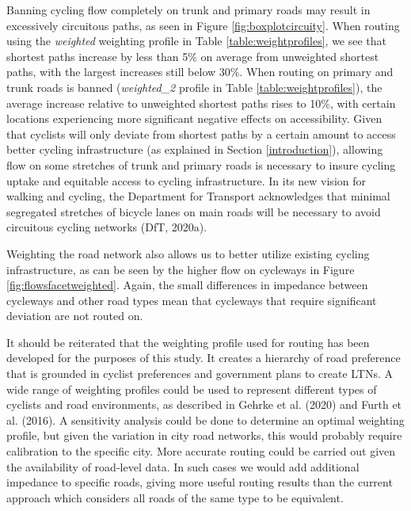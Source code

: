 \documentclass[
]{article}
\begin{document}
Banning cycling flow completely on trunk and primary roads may result in
excessively circuitous paths, as seen in Figure
\ref{fig:boxplotcircuity}. When routing using the \emph{weighted} weighting
profile in Table \ref{table:weightprofiles}, we see that shortest paths
increase by less than 5\% on average from unweighted shortest paths, with
the largest increases still below 30\%. When routing on primary and trunk
roads is banned (\emph{weighted\_2} profile in Table
\ref{table:weightprofiles}), the average increase relative to
unweighted shortest paths rises to 10\%, with certain locations
experiencing more significant negative effects on accessibility. Given
that cyclists will only deviate from shortest paths by a certain amount
to access better cycling infrastructure (as explained in Section
\ref{introduction}), allowing flow on some stretches of trunk and
primary roads is necessary to insure cycling uptake and equitable access
to cycling infrastructure. In its new vision for walking and cycling,
the Department for Transport acknowledges that minimal segregated
stretches of bicycle lanes on main roads will be necessary to avoid
circuitous cycling networks (DfT, 2020a).

Weighting the road network also allows us to better utilize existing
cycling infrastructure, as can be seen by the higher flow on cycleways
in Figure \ref{fig:flowsfacetweighted}. Again, the small differences in
impedance between cycleways and other road types mean that cycleways
that require significant deviation are not routed on.

It should be reiterated that the weighting profile used for routing has
been developed for the purposes of this study. It creates a hierarchy of
road preference that is grounded in cyclist preferences and government
plans to create LTNs. A wide range of weighting profiles could be used
to represent different types of cyclists and road environments, as
described in Gehrke et al. (2020) and Furth et al. (2016). A sensitivity
analysis could be done to determine an optimal weighting profile, but
given the variation in city road
networks, this would probably
require calibration to the specific city. More accurate routing could be
carried out given the availability of road-level data. In such cases we
would add additional impedance to specific roads, giving more useful
routing results than the current approach which considers all roads
of the same type to be equivalent.
\end{document}
